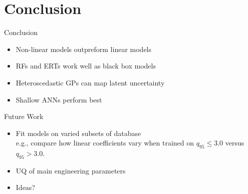 \documentclass{beamer}
\begin{document}
\section{Conclusion}
\begin{frame}
\begin{block}{Conclusion}
	\begin{itemize}
		\item Non-linear models outpreform linear models 
		\item RFs and ERTs work well as black box models
		\item Heteroscedastic GPs can map latent uncertainty
		\item Shallow ANNs perform best
	\end{itemize}
	\end{block}
	\begin{block}{Future Work}
		\begin{itemize}
			\item Fit models on varied subsets of database \\  e.g., compare how linear coefficients vary when trained on $q_{95} \leq 3.0$ versus $q_{95} > 3.0$.  
			\item UQ of main engineering parameters
			\item Ideas? 
		\end{itemize}
	\end{block}
\end{frame}
\end{document}
